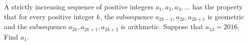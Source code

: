 A strictly increasing sequence of positive integers $a_1, a_2, a_3, \ldots$ has the property that for every positive integer $k$,  the subsequence $a_{2k-1}, a_{2k}, a_{2k+1}$ is geometric and the subsequence $a_{2k}, a_{2k+1}, a_{2k+2}$ is arithmetic. Suppose that $a_{13} = 2016$. Find $a_1$.